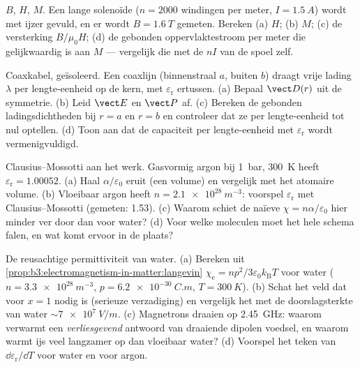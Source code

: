 \begin{exercise}[$\star$]\label{exo:b3:electromagnetism-in-matter:4}
$B$, $H$, $M$. Een lange solenoïde ($n = \num{2000}$ windingen per meter,
$I = \qty{1.5}{A}$) wordt met ijzer gevuld, en er wordt $B = \qty{1.6}{T}$
gemeten. Bereken (a) $H$; (b) $M$; (c) de versterking
$B/\mu_0H$; (d) de gebonden oppervlaktestroom per meter die gelijkwaardig is aan
$M$ --- vergelijk die met de $nI$ van de spoel zelf.
\end{exercise}

\begin{exercise}[$\star\star$]\label{exo:b3:electromagnetism-in-matter:5}
Coaxkabel, geïsoleerd. Een coaxlijn (binnenstraal $a$, buiten
$b$) draagt vrije lading $\lambda$ per lengte-eenheid op de kern,
met  $\varepsilon_{\text{r}}$ ertussen. (a) Bepaal
$\vect D(r)$ uit de symmetrie. (b) Leid $\vect E$ en $\vect P$ af.
(c) Bereken de gebonden ladingsdichtheden bij $r = a$ en $r = b$ en
controleer dat ze per lengte-eenheid tot nul optellen. (d) Toon aan dat de capaciteit
per lengte-eenheid met $\varepsilon_{\text{r}}$ wordt vermenigvuldigd.
\end{exercise}

\begin{exercise}[$\star\star$]\label{exo:b3:electromagnetism-in-matter:6}
Clausius--Mossotti aan het werk. Gasvormig argon bij \qty{1}{bar},
\qty{300}{K} heeft $\varepsilon_{\text{r}} = 1.00052$. (a) Haal
$\alpha/\varepsilon_0$ eruit (een volume) en vergelijk met het atomaire
volume. (b) Vloeibaar argon heeft $n = \qty{2.1e28}{m^{-3}}$: voorspel
$\varepsilon_{\text{r}}$ met Clausius--Mossotti (gemeten: 1.53).
(c) Waarom schiet de naïeve $\chi = n\alpha/\varepsilon_0$ hier minder
ver door dan voor water? (d) Voor welke moleculen moet het hele
schema falen, en wat komt ervoor in de plaats?
\end{exercise}

\begin{exercise}[$\star\star$]\label{exo:b3:electromagnetism-in-matter:7}
De reusachtige permittiviteit van water. (a) Bereken uit
\cref{prop:b3:electromagnetism-in-matter:langevin}
$\chi_{\text{e}} = np^2/3\varepsilon_0k_{\text{B}}T$ voor water
($n = \qty{3.3e28}{m^{-3}}$, $p = \qty{6.2e-30}{C.m}$,
$T = \qty{300}{K}$). (b) Schat het veld dat voor $x = 1$ nodig is
(serieuze verzadiging) en vergelijk het met de doorslagsterkte van water
$\sim\qty{7e7}{V/m}$. (c) Magnetrons draaien op \qty{2.45}{GHz}:
waarom verwarmt een \emph{verliesgevend} antwoord van draaiende dipolen voedsel, en
waarom warmt ijs veel langzamer op dan vloeibaar water? (d) Voorspel
het teken van $\dd\varepsilon_{\text{r}}/\dd T$ voor water en voor
argon.
\end{exercise}

